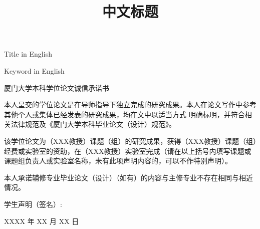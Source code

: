 \documentclass{xmu}
\begin{document}
\print

\arabicchapter


\minor

\title{中文标题}
{Title in English}
\author{}
\idn{}
\college{}
\subject{}
\grade{}

\pubdate{}

{Keyword in English}

\maketitle

\vspace*{-2.45em}
\pagestyle{plain}
\begin{center}
    \sf{}厦门大学本科学位论文诚信承诺书
\end{center}
\vspace{1.5em}
{
    \renewcommand{\baselinestretch}{2}
    \par
    本人呈交的学位论文是在导师指导下独立完成的研究成果。本人在论文写作中参考其他个人或集体已经发表的研究成果，均在文中以适当方式 明确标明，并符合相关法律规范及《厦门大学本科毕业论文（设计）规范》。
    \par
    该学位论文为（XXX教授）课题（组）的研究成果，获得（XXX教授）课题（组）经费或实验室的资助，在（XXX教授）实验室完成（请在以上括号内填写课题或课题组负责人或实验室名称，未有此项声明内容的，可以不作特别声明）。
    \par
    本人承诺辅修专业毕业论文（设计）（如有）的内容与主修专业不存在相同与相近情况。
    \vspace{4em}
    \par
    \hfill 学生声明（签名）:\qquad \qquad \qquad \quad~
    \par
    \hfill XXXX 年 XX 月 XX 日
    \par
}
\clearpage

\blankpagetitle
\end{document}
